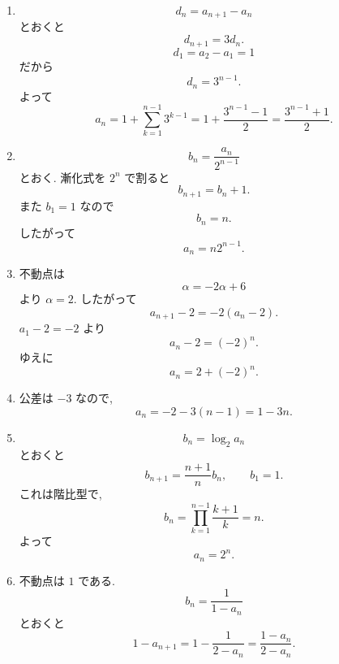 \begin{enumerate}[label=\textbf{問\arabic*.},leftmargin=3.8em,format=\bookitemlink{practice-basic}{solution}{problem}]
\[            \qquad d_1=2.
          \]
              よって
          \[
            d_n=2\left(-\frac12\right)^{n-1}.
          \]
              したがって
          \[
            a_n
            =2+
            2\sum_{k=1}^{n-1}
            \left(-\frac12\right)^{k-1}.
          \]
              等比数列の和を用いて
          \[
            a_n=
            2+\frac43
            \left(1-\left(-\frac12\right)^{n-1}\right)
            =
            \frac{10}{3}
            -\frac43\left(-\frac12\right)^{n-1}.
          \]
        \item \[
            d_n=a_{n+1}-a_n
          \]
              とおくと
          \[
            d_{n+1}=3d_n.
          \]
          \[
            d_1=a_2-a_1=1
          \]
              だから
          \[
            d_n=3^{n-1}.
          \]
              よって
          \[
            a_n
            =1+\sum_{k=1}^{n-1}3^{k-1}
            =1+\frac{3^{n-1}-1}{2}
            =\frac{3^{n-1}+1}{2}.
          \]
        \item \[
            b_n=\frac{a_n}{2^{n-1}}
          \]
              とおく.
              漸化式を \(2^n\) で割ると
          \[
            b_{n+1}=b_n+1.
          \]
              また \(b_1=1\) なので
          \[
            b_n=n.
          \]
              したがって
          \[
            a_n=n2^{n-1}.
          \]
        \item 不動点は
          \[
            \alpha=-2\alpha+6
          \]
              より \(\alpha=2\).
              したがって
          \[
            a_{n+1}-2=-2(a_n-2).
          \]
              \(a_1-2=-2\) より
          \[
            a_n-2=(-2)^n.
          \]
              ゆえに
          \[
            a_n=2+(-2)^n.
          \]
        \item 公差は \(-3\) なので,
          \[
            a_n=-2-3(n-1)=1-3n.
          \]
        \item \[
            b_n=\log_2a_n
          \]
              とおくと
          \[
            b_{n+1}=\frac{n+1}{n}b_n,
            \qquad b_1=1.
          \]
              これは階比型で,
          \[
            b_n
            =\prod_{k=1}^{n-1}\frac{k+1}{k}
            =n.
          \]
              よって
          \[
            a_n=2^n.
          \]
        \item 不動点は \(1\) である.
          \[
            b_n=\frac1{1-a_n}
          \]
              とおくと
          \[
            1-a_{n+1}
            =
            1-\frac1{2-a_n}
            =
            \frac{1-a_n}{2-a_n}.
          \]

\end{enumerate}
